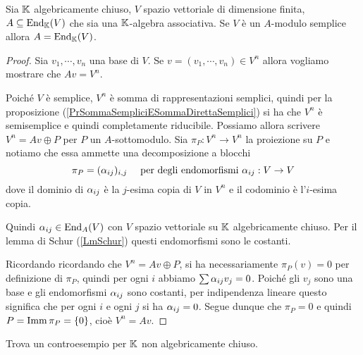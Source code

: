 \begin{theorem}\label{ThSottoalgebraAssociativaDiEndomorfismiDiSempliceETuttiGliEndomorfismi}
Sia $\mathbb{K}$ algebricamente chiuso, $V$ spazio vettoriale di dimensione finita, $A\subseteq \operatorname{End}_{\mathbb{K}}(V)$ che sia una $\mathbb{K}$-algebra associativa. Se $V$ \`e un $A$-modulo semplice allora $A=\operatorname{End}_{\mathbb{K}}(V)$.
\end{theorem}
\begin{proof}
Sia $v_1,\cdots, v_n$ una base di $V$. Se $v=(v_1,\cdots, v_n)\in V^n$ allora vogliamo mostrare che $Av=V^n$.

Poich\'e $V$ \`e semplice, $V^n$ \`e somma di rappresentazioni semplici, quindi per la proposizione (\ref{PrSommaSempliciESommaDirettaSemplici}) si ha che $V^n$ \`e semisemplice e quindi completamente riducibile. Possiamo allora scrivere $V^n=Av\oplus P$ per $P$ un $A$-sottomodulo. Sia $\pi_P:V^n\to V^n$ la proiezione su $P$ e notiamo che essa ammette una decomposizione a blocchi
\[\pi_P=(\alpha_{ij})_{i,j}\quad\text{ per degli endomorfismi }\alpha_{ij}:V\to V\]
dove il dominio di $\alpha_{ij}$ \`e la $j$-esima copia di $V$ in $V^n$ e il codominio \`e l'$i$-esima copia.

Quindi $\alpha_{ij}\in \operatorname{End}_A(V)$ con $V$ spazio vettoriale su $\mathbb{K}$ algebricamente chiuso. Per il lemma di Schur (\ref{LmSchur}) questi endomorfismi sono le costanti.

Ricordando ricordando che $V^n=Av\oplus P$, si ha necessariamente $\pi_P(v)=0$ per definizione di $\pi_P$, quindi per ogni $i$ abbiamo $\sum \alpha_{ij}v_j=0$. Poich\'e gli $v_j$ sono una base e gli endomorfismi $\alpha_{ij}$ sono costanti, per indipendenza lineare questo significa che per ogni $i$ e ogni $j$ si ha $\alpha_{ij}=0$. Segue dunque che $\pi_P=0$ e quindi $P=\operatorname{Imm} \pi_P=\left\{{0}\right\}$, cio\`e $V^n=Av$.
\end{proof}

\begin{exercise}
Trova un controesempio per $\mathbb{K}$ non algebricamente chiuso.
\end{exercise}

